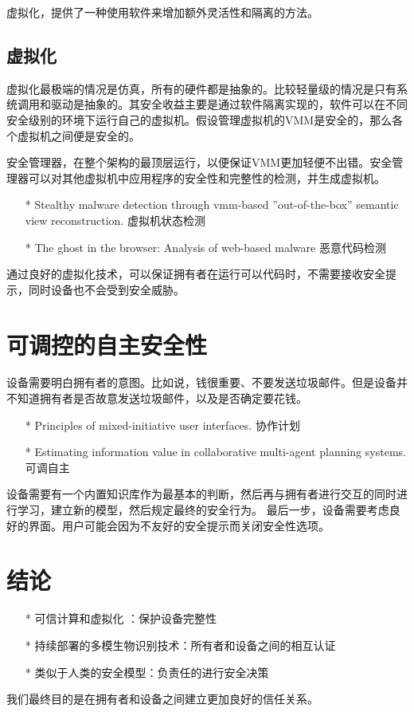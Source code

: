 \documentclass[UTF8]{ctexart}
\begin{document}
    虚拟化，提供了一种使用软件来增加额外灵活性和隔离的方法。
    \subsection{虚拟化}
虚拟化最极端的情况是仿真，所有的硬件都是抽象的。比较轻量级的情况是只有系统调用和驱动是抽象的。其安全收益主要是通过软件隔离实现的，软件可以在不同安全级别的环境下运行自己的虚拟机。假设管理虚拟机的VMM是安全的，那么各个虚拟机之间便是安全的。

    安全管理器，在整个架构的最顶层运行，以便保证VMM更加轻便不出错。安全管理器可以对其他虚拟机中应用程序的安全性和完整性的检测，并生成虚拟机。
    \begin{itemize} 
    \item[*] Stealthy malware detection through vmm-based ”out-of-the-box” semantic view reconstruction.  虚拟机状态检测
    \item[*] The ghost in the browser: Analysis of web-based malware 恶意代码检测
    \end{itemize}
    通过良好的虚拟化技术，可以保证拥有者在运行可以代码时，不需要接收安全提示，同时设备也不会受到安全威胁。
	\clearpage
	\section{可调控的自主安全性}\label{sec:disijie}
	设备需要明白拥有者的意图。比如说，钱很重要、不要发送垃圾邮件。但是设备并不知道拥有者是否故意发送垃圾邮件，以及是否确定要花钱。
    \begin{itemize} 
    \item[*] Principles of mixed-initiative user interfaces. 协作计划
    \item[*] Estimating information value in collaborative multi-agent planning systems. 可调自主
    \end{itemize}
    设备需要有一个内置知识库作为最基本的判断，然后再与拥有者进行交互的同时进行学习，建立新的模型，然后规定最终的安全行为。
    最后一步，设备需要考虑良好的界面。用户可能会因为不友好的安全提示而关闭安全性选项。
    \clearpage
	\section{结论}\label{sec:diwujie}
    \begin{itemize} 
    \item[*] 可信计算和虚拟化 ：保护设备完整性
    \item[*] 持续部署的多模生物识别技术：所有者和设备之间的相互认证
    \item[*] 类似于人类的安全模型：负责任的进行安全决策
    \end{itemize}
    我们最终目的是在拥有者和设备之间建立更加良好的信任关系。
	\clearpage
	
\end{document}
